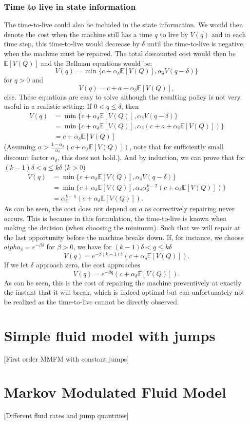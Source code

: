 \subsubsection{Time to live in state information}
The time-to-live could also be included in the state information.
We would then denote the cost when the machine still has a time $q$ to live by $V(q)$ and in each time step, this time-to-live would decrease by $\delta$ until the time-to-live is negative, when the machine must be repaired.
The total discounted cost would then be $\mathbb{E}[V(Q)]$ and the Bellman equations would be:
$$
V(q)=\min\{
c+\alpha_{\delta} \mathbb{E}[V(Q)],
\alpha_{\delta} V(q-\delta)
\}
$$
for $q>0$ and
$$
V(q)=c + a + \alpha_{\delta} \mathbb{E}[V(Q)],
$$
else.
These equations are easy to solve although the resulting policy is not very useful in a realistic setting:
If $0<q\leq\delta$, then 
\begin{equation}\begin{split}
V(q)&=\min\{
c+\alpha_{\delta} \mathbb{E}[V(Q)],\alpha_{\delta} V(q-\delta)\}\\
&=\min\{
c+\alpha_{\delta} \mathbb{E}[V(Q)],\alpha_{\delta}(c+a+\alpha_{\delta} \mathbb{E}[V(Q)])\}\\
&=c+\alpha_{\delta} \mathbb{E}[V(Q)]
\end{split}
\end{equation}
(Assuming $a>\frac{1-\alpha_\delta}{\alpha_\delta}(c+\alpha_\delta\mathbb{E}[V(Q)])$, note that for sufficiently small discount factor $\alpha_\delta$, this does not hold.).
And by induction, we can prove that for $(k-1)\delta<q\leq k\delta$ ($k>0$)
\begin{equation}\begin{split}
V(q)&=\min\{
c+\alpha_{\delta} \mathbb{E}[V(Q)],\alpha_{\delta} V(q-\delta)\}\\
&=\min\{
c+\alpha_{\delta} \mathbb{E}[V(Q)],\alpha_{\delta} \alpha_{\delta}^{k-2}(c+\alpha_\delta\mathbb{E}[V(Q)])\}\\
&=\alpha_{\delta}^{k-1}(c+\alpha_\delta\mathbb{E}[V(Q)]).
\end{split}
\end{equation}
As can be seen, the cost does not depend on $a$ as correctively repairing never occurs. This is because in this formulation, the time-to-live is known when making the decision (when choosing the minimum). Such that we will repair at the last opportunity before the machine breaks down.
If, for instance, we choose $alpha_\delta=e^{-\beta \delta}$ for $\beta>0$, we have for $(k-1)\delta<q\leq k\delta$
$$
V(q)=e^{-\beta(k-1)\delta}(c+\alpha_\delta\mathbb{E}[V(Q)]).
$$
If we let $\delta$ approach zero, the cost approaches 
$$
V(q)=e^{-\beta q}(c+\alpha_\delta\mathbb{E}[V(Q)]).
$$
As can be seen, this is the cost of repairing the machine preventively at exactly the instant that it will break, which is indeed optimal but can unfortunately not be realized as the time-to-live cannot be directly observed.
\section{Simple fluid model with jumps}
[First order MMFM with constant jumps]
\section{Markov Modulated Fluid Model}
[Different fluid rates and jump quantities]